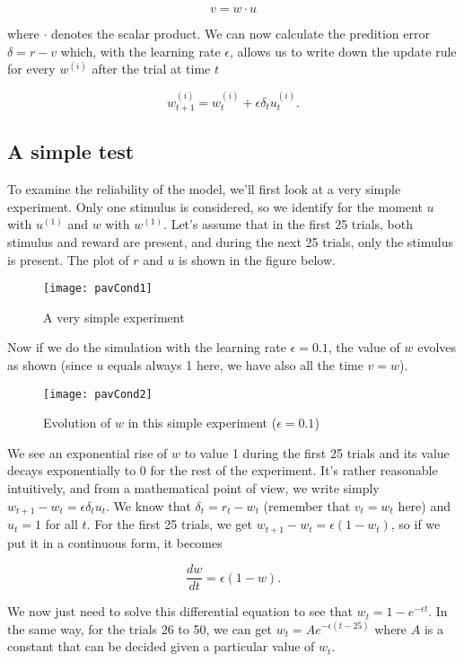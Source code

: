 \[v = w\cdot u\]

\noindent
where $\cdot$ denotes the scalar product. We can now calculate the predition
error $\delta = r - v$ which, with the learning rate $\epsilon$, allows us to
write down the update rule for every $w^{(i)}$ after the trial at time $t$

\[w_{t+1}^{(i)} = w_t^{(i)} + \epsilon\delta_t u_t^{(i)}.\]


\subsection{A simple test}

To examine the reliability of the model, we'll first look at a very simple
experiment. Only one stimulus is considered, so we identify for the moment
$u$ with $u^{(1)}$ and $w$ with $w^{(1)}$. Let's assume that in the first 25 
trials, both stimulus and reward are present, and during the next 25 
trials, only the stimulus is present. The plot of $r$ and $u$ is shown in 
the figure below.

\vspace{-1em}
\begin{figure}[H]
  \centering
  \texttt{[image: pavCond1]}
  \caption{A very simple experiment}
\end{figure}

Now if we do the simulation with the learning rate $\epsilon = 0.1$, the value 
of $w$ evolves as shown (since $u$ equals always 1 here, we have also all the 
time $v = w$).

\vspace{-1em}
\begin{figure}[H]
  \centering
  \texttt{[image: pavCond2]}
  \caption{Evolution of $w$ in this simple experiment ($\epsilon = 0.1$)}
\end{figure}

We see an exponential rise of $w$ to value 1 during the first 25 trials and 
its value decays exponentially to 0 for the rest of the experiment. It's 
rather reasonable intuitively, and from a mathematical point of view, we 
write simply $w_{t+1} - w_t = \epsilon\delta_t u_t$. We know that 
$\delta_t = r_t - w_t$ (remember that $v_t = w_t$ here) and $u_t = 1$ for all 
$t$. For the first 25 trials, we get $w_{t+1} - w_t = \epsilon(1 - w_t)$, so
if we put it in a continuous form, it becomes 

\[\frac{dw}{dt} = \epsilon(1-w).\]

\noindent
We now just need to solve this differential equation to see that 
$w_t = 1 - e^{-\epsilon t}$. In the same way, for the trials 26 to 50,
we can get $w_t = Ae ^ {-\epsilon(t-25)} $ where $A$ is a constant that can be
decided given a particular value of $w_t$. 

